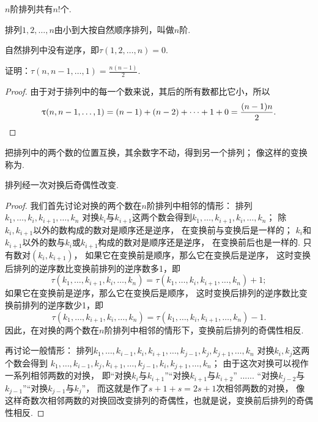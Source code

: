 \begin{property}
\(n\)阶排列共有\(n!\)个.
\end{property}

\begin{definition}
排列\(1,2,\dotsc,n\)由小到大按自然顺序排列，叫做\(n\)阶.
\end{definition}

\begin{property}
自然排列中没有逆序，即\(\tau(1,2,\dotsc,n)=0\).
\end{property}

\begin{example}
证明：\(\tau(n,n-1,\dotsc,1)=\frac{n(n-1)}{2}\).
\begin{proof}
由于对于排列中的每一个数来说，其后的所有数都比它小，所以\[
	\tau(n,n-1,\dotsc,1)
	= (n-1) + (n-2) + \dotsb + 1 + 0
	= \frac{(n-1)n}{2}.
	\qedhere
\]
\end{proof}
\end{example}

\begin{definition}
把排列中的两个数的位置互换，其余数字不动，得到另一个排列；
像这样的变换称为.
\end{definition}

\begin{theorem}
排列经一次对换后奇偶性改变.
\begin{proof}
我们首先讨论对换的两个数在\(n\)阶排列中相邻的情形：
排列\(k_1,\dotsc,k_i,k_{i+1},\dotsc,k_n\)
对换\(k_i\)与\(k_{i+1}\)这两个数会得到\(k_1,\dotsc,k_{i+1},k_i,\dotsc,k_n\)；
除\(k_i,k_{i+1}\)以外的数构成的数对是顺序还是逆序，
在变换前与变换后是一样的；
\(k_i\)和\(k_{i+1}\)以外的数与\(k_i\)或\(k_{i+1}\)构成的数对是顺序还是逆序，
在变换前后也是一样的.
只有数对\((k_i,k_{i+1})\)，
如果它在变换前是顺序，那么它在变换后是逆序，
这时变换后排列的逆序数比变换前排列的逆序数多1，即\[
	\tau(k_1,\dotsc,k_{i+1},k_i,\dotsc,k_n)
	= \tau(k_1,\dotsc,k_i,k_{i+1},\dotsc,k_n) + 1;
\]
如果它在变换前是逆序，那么它在变换后是顺序，
这时变换后排列的逆序数比变换前排列的逆序数少1，即\[
	\tau(k_1,\dotsc,k_{i+1},k_i,\dotsc,k_n)
	= \tau(k_1,\dotsc,k_i,k_{i+1},\dotsc,k_n) - 1.
\]
因此，在对换的两个数在\(n\)阶排列中相邻的情形下，变换前后排列的奇偶性相反.

再讨论一般情形：
排列\(k_1,\dotsc,k_{i-1},k_i,k_{i+1},\dotsc,k_{j-1},k_j,k_{j+1},\dotsc,k_n\)
对换\(k_i,k_j\)这两个数会得到
\(k_1,\dotsc,k_{i-1},k_j,k_{i+1},\dotsc,k_{j-1},k_i,k_{j+1},\dotsc,k_n\)；
由于这次对换可以视作一系列相邻两数的对换，
即“对换\(k_i\)与\(k_{i+1}\)”“对换\(k_{i+1}\)与\(k_{i+2}\)”%
......%
“对换\(k_{j-2}\)与\(k_{j-1}\)”“对换\(k_{j-1}\)与\(k_j\)”，
而这就是作了\(s+1+s=2s+1\)次相邻两数的对换，
像这样奇数次相邻两数的对换回改变排列的奇偶性，也就是说，变换前后排列的奇偶性相反.
\end{proof}
\end{theorem}

